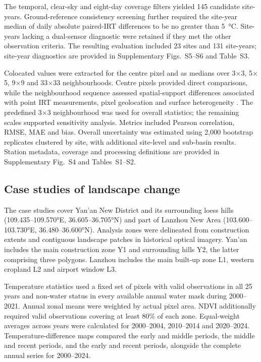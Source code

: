 The temporal, clear-sky and eight-day coverage filters yielded 145 candidate site-years. Ground-reference consistency screening further required the site-year median of daily absolute paired-IRT differences to be no greater than 5~°C. Site-years lacking a dual-sensor diagnostic were retained if they met the other observation criteria. The resulting evaluation included 23 sites and 131 site-years; site-year diagnostics are provided in Supplementary Figs.~S5--S6 and Table~S3.

Colocated \chinatherm{} values were extracted for the centre pixel and as medians over 3$\times$3, 5$\times$5, 9$\times$9 and 33$\times$33 neighbourhoods. Centre pixels provided direct comparisons, while the neighbourhood sequence assessed spatial-support differences associated with point IRT measurements, pixel geolocation and surface heterogeneity \parencite{snyder1997playa,coll2005groundValidation,yu2017validationScheme,martin2019inSitu}. The predefined 3$\times$3 neighbourhood was used for overall statistics; the remaining scales supported sensitivity analysis. Metrics included Pearson correlation, RMSE, MAE and bias. Overall uncertainty was estimated using 2,000 bootstrap replicates clustered by site, with additional site-level and sub-basin results. Station metadata, coverage and processing definitions are provided in Supplementary Fig.~S4 and Tables~S1--S2.

\subsection{Case studies of landscape change}

The case studies cover Yan'an New District and its surrounding loess hills (109.435--109.570°E, 36.605--36.705°N) and part of Lanzhou New Area (103.600--103.730°E, 36.480--36.600°N). Analysis zones were delineated from construction extents and contiguous landscape patches in historical optical imagery. Yan'an includes the main construction zone Y1 and surrounding hills Y2, the latter comprising three polygons. Lanzhou includes the main built-up zone L1, western cropland L2 and airport window L3.

Temperature statistics used a fixed set of pixels with valid \chinatherm{} observations in all 25 years and non-water status in every available annual water mask during 2000--2021. Annual zonal means were weighted by actual pixel area. NDVI additionally required valid observations covering at least 80\% of each zone. Equal-weight averages across years were calculated for 2000--2004, 2010--2014 and 2020--2024. Temperature-difference maps compared the early and middle periods, the middle and recent periods, and the early and recent periods, alongside the complete annual series for 2000--2024.
